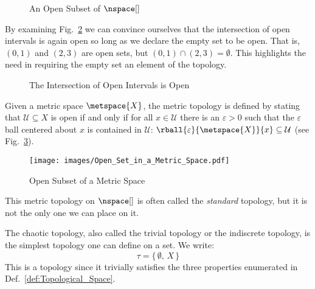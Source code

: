 \documentclass[oneside]{book}                                                  %
\begin{document}
                \begin{figure}[H]
                    \centering
                    \captionsetup{type=figure}
                    
                    \caption{An Open Subset of $\nspace[]$}
                    \label{fig:Open_Subset_of_R}
                \end{figure}
                By examining Fig.~\ref{fig:Open_Interval_Intersect_is_Open} we
                can convince ourselves that the intersection of open intervals
                is again open so long as we declare the empty set to be open.
                That is, $(0,1)$ and $(2,3)$ are open sets, but
                $(0,1)\cap(2,3)=\emptyset$. This highlights the need in
                requiring the empty set an element of the topology.
                \begin{figure}[H]
                    \centering
                    \captionsetup{type=figure}
                    
                    \caption{The Intersection of Open Intervals is Open}
                    \label{fig:Open_Interval_Intersect_is_Open}
                \end{figure}
                \begin{example}
                    Given a metric space $\metspace{X}$, the metric topology is
                    defined by stating that $\mathcal{U}\subseteq{X}$ is open if
                    and only if for all $x\in\mathcal{U}$ there is an
                    $\varepsilon>0$ such that the $\varepsilon$ ball centered
                    about $x$ is contained in $\mathcal{U}$:
                    $\rball{\varepsilon}{\metspace{X}}{x}\subseteq\mathcal{U}$
                    (see Fig.~\ref{fig:Open_Subset_Metric_Space}).
                \end{example}
                \begin{figure}[H]
                    \centering
                    \captionsetup{type=figure}
                    \texttt{[image: images/Open\_Set\_in\_a\_Metric\_Space.pdf]}
                    \caption{Open Subset of a Metric Space}
                    \label{fig:Open_Subset_Metric_Space}
                \end{figure}
                This metric topology on $\nspace[]$ is often called the
                \textit{standard} topology, but it is not the only one we can
                place on it.
                \begin{example}
                    The chaotic topology, also called the trivial topology or
                    the indiscrete topology, is the simplest topology one can
                    define on a set. We write:
                    \begin{equation}
                        \tau=\{\,\emptyset,\,X\,\}
                    \end{equation}
                    This is a topology since it trivially satisfies the three
                    properties enumerated in Def.~\ref{def:Topological_Space}.
                \end{example}
\end{document}
